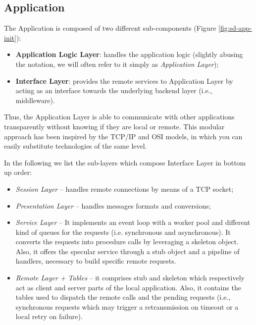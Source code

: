 \subsection{Application}
The Application is composed of two different sub-components (Figure
\ref{fig:sd-app-init}):

\begin{itemize}
  \item \textbf{Application Logic Layer}: handles the application logic
    (slightly abusing the notation, we will often refer to it simply as
    \textit{Application Layer});
  \item \textbf{Interface Layer}: provides the remote services to Application
    Layer by acting as an interface towards the underlying backend layer (i.e.,
    middleware).
\end{itemize}

Thus, the Application Layer is able to communicate with other applications
transparently without knowing if they are local or remote. This modular
approach has been inspired by the TCP/IP and OSI models, in which you can
easily substitute technologies of the same level.

In the following we list the sub-layers which compose Interface Layer in
bottom up order:

\begin{itemize}
  \item \textit{Session Layer} --
  handles remote connections by means of a TCP socket;
  \item \textit{Presentation Layer} --
  handles messages formats and conversions;
  \item \textit{Service Layer} --
  It
  implements an event loop with a worker pool and different kind of queues
  for the requests (i.e. synchronous and asynchronous). It converts the
  requests into procedure calls by leveraging a skeleton object.
  Also, it offers the specular service through a stub object and a pipeline
  of handlers, necessary to build specific remote requests.
  \item \textit{Remote Layer + Tables} --
  it comprises stub and skeleton which respectively act as client and
  server parts of the local application. Also, it contains the tables used
  to dispatch the remote calls and the pending requests (i.e., synchronous
  requests which may trigger a retransmission on timeout or a local retry on
  failure).
\end{itemize}



